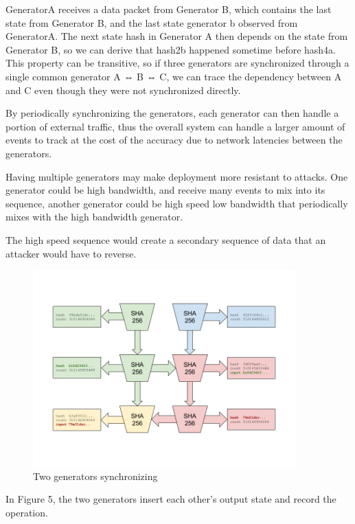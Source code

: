 \documentclass[12pt]{article}
\begin{document}
GeneratorA receives a data packet from Generator B, which contains the last state from Generator B, and the last state generator b observed from GeneratorA.  The next state hash in Generator A then depends on the state from Generator B, so we can derive that hash2b happened sometime before hash4a.  This property can be transitive, so if three generators are synchronized through a single common generator A ⇔ B ⇔ C, we can trace the dependency between A and C even though they were not synchronized directly.

By periodically synchronizing the generators, each generator can then handle a portion of external traffic, thus the overall system can handle a larger amount of events to track at the cost of the accuracy due to network latencies between the generators.

Having multiple generators may make deployment more resistant to attacks.  One generator could be high bandwidth, and receive many events to mix into its sequence, another generator could be high speed low bandwidth that periodically mixes with the high bandwidth generator.

The high speed sequence would create a secondary sequence of data that an attacker would have to reverse.

\begin{figure}
  \begin{center}
    \centering
    \includegraphics[width=0.9\textwidth]{figures/fig_5.png}
    \caption[Fig 5]{Two generators synchronizing\label{fig_5}}
  \end{center}
  \end{figure}

In Figure 5, the two generators insert each other’s output state and record the operation.  
\end{document}
